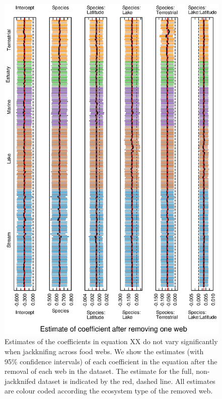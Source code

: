 \documentclass[12pt]{article}
\begin{document}
    \begin{figure}[h]
    \centerline{\includegraphics*[width=.8\textwidth]{Figures/Jackknife/LS_web.eps}}
    \caption{Estimates of the coefficients in equation XX do not vary significantly
    when jackknifing across food webs. We show the estimates (with 95\% confidence intervals) of each coefficient
    in the equation after the removal of each web in the dataset. 
    The estimate for the full, non-jackknifed
    dataset is indicated by the red, dashed line. All estimates are colour
    coded according the ecosystem type of the removed web.}
    \label{LS_web}
    \end{figure}
\end{document}
